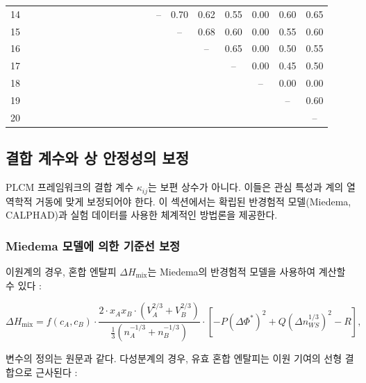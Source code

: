 \documentclass[12pt,a4paper]{article}
\begin{document}
{\begin{longtable}{c|*{20}{c}}
			14 &   &   &   &   &   &   &   &   &   &   &   &   &   & – & 0.70 & 0.62 & 0.55 & 0.00 & 0.60 & 0.65 \\
			15 &   &   &   &   &   &   &   &   &   &   &   &   &   &   & – & 0.68 & 0.60 & 0.00 & 0.55 & 0.60 \\
			16 &   &   &   &   &   &   &   &   &   &   &   &   &   &   &   & – & 0.65 & 0.00 & 0.50 & 0.55 \\
			17 &   &   &   &   &   &   &   &   &   &   &   &   &   &   &   &   & – & 0.00 & 0.45 & 0.50 \\
			18 &   &   &   &   &   &   &   &   &   &   &   &   &   &   &   &   &   & – & 0.00 & 0.00 \\
			19 &   &   &   &   &   &   &   &   &   &   &   &   &   &   &   &   &   &   & – & 0.60 \\
			20 &   &   &   &   &   &   &   &   &   &   &   &   &   &   &   &   &   &   &   & – \\
			\bottomrule
	\end{longtable}}
	
	\subsection{결합 계수와 상 안정성의 보정}
	\label{subsec:calibration}
	
	PLCM 프레임워크의 결합 계수 \(\kappa_{ij}\)는 보편 상수가 아니다. 이들은 관심 특성과 계의 열역학적 거동에 맞게 보정되어야 한다. 이 섹션에서는 확립된 반경험적 모델(Miedema, CALPHAD)과 실험 데이터를 사용한 체계적인 방법론을 제공한다.
	
	\subsubsection{Miedema 모델에 의한 기준선 보정}
	
	이원계의 경우, 혼합 엔탈피 \(\Delta H_{\text{mix}}\)는 Miedema의 반경험적 모델을 사용하여 계산할 수 있다 \cite{Miedema1980, Takeuchi2010}:
	
	\begin{equation}
		\Delta H_{\text{mix}} = f(c_A, c_B) \cdot \frac{2 \cdot x_A x_B \cdot (V_A^{2/3} + V_B^{2/3})}{\frac{1}{3}(n_A^{-1/3} + n_B^{-1/3})}
		\cdot \left[ -P (\Delta \Phi^*)^2 + Q (\Delta n_{WS}^{1/3})^2 - R \right],
		\label{eq:miedema}
	\end{equation}
	
	변수의 정의는 원문과 같다. 다성분계의 경우, 유효 혼합 엔탈피는 이원 기여의 선형 결합으로 근사된다 \cite{Takeuchi2010}:
	
\end{document}

